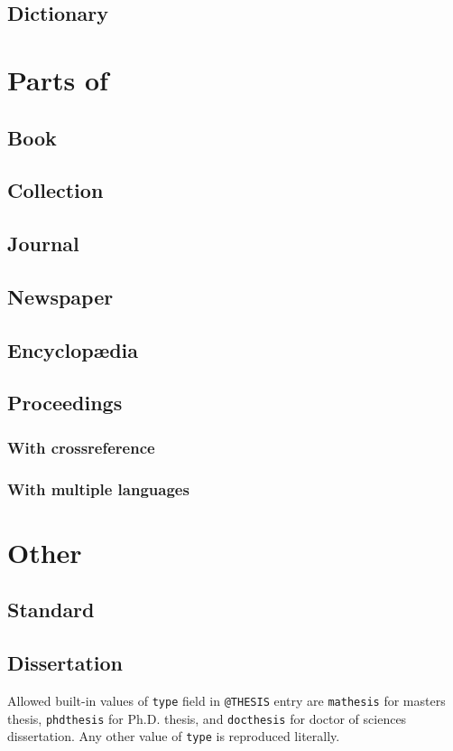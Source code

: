 \documentclass[a4paper]{article}
\begin{document}
\subsection{Dictionary}
\section{Parts of}
\subsection{Book}
\subsection{Collection}
\subsection{Journal}
\subsection{Newspaper}
\subsection{Encyclop\ae dia}
\subsection{Proceedings}
\subsubsection{With crossreference}
\subsubsection{With multiple languages}
\section{Other}
\subsection{Standard}
\subsection{Dissertation}
Allowed built-in values of \verb|type| field in \verb|@THESIS| entry are \verb|mathesis| for masters thesis, \verb|phdthesis| for Ph.D. thesis, and \verb|docthesis| for doctor of sciences dissertation. Any other value of \verb|type| is reproduced literally.
\end{document}
